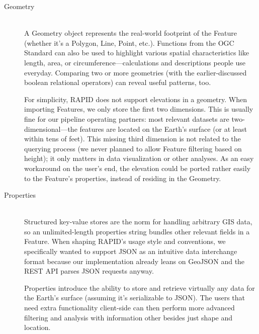 \begin{description}
  \item[Geometry] \hfill \\
  A Geometry object represents the real-world footprint of the Feature (whether it's a Polygon, Line, Point, etc.). Functions from the OGC Standard can also be used to highlight various spatial characteristics like length, area, or circumference---calculations and descriptions people use everyday. Comparing two or more geometries (with the earlier-discussed boolean relational operators) can reveal useful patterns, too.
   
   For simplicity, RAPID does not support elevations in a geometry. When importing Features, we only store the first two dimensions. This is usually fine for our pipeline operating partners: most relevant datasets are two-dimensional---the features are located on the Earth's surface (or at least within tens of feet). This missing third dimension is not related to the querying process (we never planned to allow Feature filtering based on height); it only matters in data visualization or other analyses. As an easy workaround on the user's end, the elevation could be ported rather easily to the Feature's properties, instead of residing in the Geometry.
  
  \item[Properties] \hfill \\
  Structured key-value stores are the norm for handling arbitrary GIS data, so an unlimited-length properties string bundles other relevant fields in a Feature. When shaping RAPID's usage style and conventions, we specifically wanted to support JSON as an intuitive data interchange format because our implementation already leans on GeoJSON and the REST API parses JSON requests anyway.
  
  Properties introduce the ability to store and retrieve virtually any data for the Earth's surface (assuming it's serializable to JSON). The users that need extra functionality client-side can then perform more advanced filtering and analysis with information other besides just shape and location.
  

\end{description}
